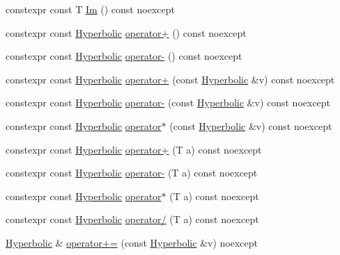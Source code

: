 \begin{DoxyCompactItemize}
constexpr const T \mbox{\hyperlink{structmage_1_1_hyperbolic_a1d213f3c1688f064f11311728fef61c7}{Im}} () const noexcept
\item 
constexpr const \mbox{\hyperlink{structmage_1_1_hyperbolic}{Hyperbolic}} \mbox{\hyperlink{structmage_1_1_hyperbolic_a0a10618ebc7e81c2830118d17f241180}{operator+}} () const noexcept
\item 
constexpr const \mbox{\hyperlink{structmage_1_1_hyperbolic}{Hyperbolic}} \mbox{\hyperlink{structmage_1_1_hyperbolic_ae73e59c395f4e77003e2f8b8a2dbfc64}{operator-\/}} () const noexcept
\item 
constexpr const \mbox{\hyperlink{structmage_1_1_hyperbolic}{Hyperbolic}} \mbox{\hyperlink{structmage_1_1_hyperbolic_a6da318ff5bbc10ebe9afa53c5ba20e4a}{operator+}} (const \mbox{\hyperlink{structmage_1_1_hyperbolic}{Hyperbolic}} \&v) const noexcept
\item 
constexpr const \mbox{\hyperlink{structmage_1_1_hyperbolic}{Hyperbolic}} \mbox{\hyperlink{structmage_1_1_hyperbolic_a701a1570eb486a968e2eec7897383b00}{operator-\/}} (const \mbox{\hyperlink{structmage_1_1_hyperbolic}{Hyperbolic}} \&v) const noexcept
\item 
constexpr const \mbox{\hyperlink{structmage_1_1_hyperbolic}{Hyperbolic}} \mbox{\hyperlink{structmage_1_1_hyperbolic_a1707d012d955bad4f580827e89d2ce5c}{operator$\ast$}} (const \mbox{\hyperlink{structmage_1_1_hyperbolic}{Hyperbolic}} \&v) const noexcept
\item 
constexpr const \mbox{\hyperlink{structmage_1_1_hyperbolic}{Hyperbolic}} \mbox{\hyperlink{structmage_1_1_hyperbolic_af07bad6751d35e562f8184161ae87c15}{operator+}} (T a) const noexcept
\item 
constexpr const \mbox{\hyperlink{structmage_1_1_hyperbolic}{Hyperbolic}} \mbox{\hyperlink{structmage_1_1_hyperbolic_a3b5c1c45c2da2583c7889613e47032ad}{operator-\/}} (T a) const noexcept
\item 
constexpr const \mbox{\hyperlink{structmage_1_1_hyperbolic}{Hyperbolic}} \mbox{\hyperlink{structmage_1_1_hyperbolic_a1aee33b8468529e392bdd04a551abd4e}{operator$\ast$}} (T a) const noexcept
\item 
constexpr const \mbox{\hyperlink{structmage_1_1_hyperbolic}{Hyperbolic}} \mbox{\hyperlink{structmage_1_1_hyperbolic_a95a357cfc21a1b3b0eb7944a04c92398}{operator/}} (T a) const noexcept
\item 
\mbox{\hyperlink{structmage_1_1_hyperbolic}{Hyperbolic}} \& \mbox{\hyperlink{structmage_1_1_hyperbolic_a6a6b6036245e932f82cd47641a6b2eac}{operator+=}} (const \mbox{\hyperlink{structmage_1_1_hyperbolic}{Hyperbolic}} \&v) noexcept

\end{DoxyCompactItemize}
